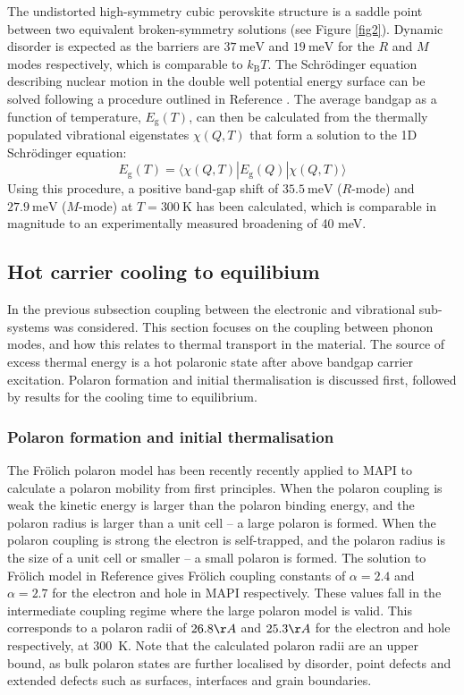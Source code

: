 \begin{table}
The undistorted high-symmetry cubic perovskite structure is a saddle point between two equivalent broken-symmetry solutions (see Figure \ref{fig2}). Dynamic disorder is expected as the barriers are $37\ \textrm{meV}$ and $19\ \textrm{meV}$ for the $R$ and $M$ modes respectively, which is comparable to $k_\mathrm{B}T$. 
The Schr\"{o}dinger equation describing nuclear motion in the double well potential energy surface can be solved following a procedure outlined in Reference \cite{Skelton2016a}. 
The average bandgap as a function of temperature, $E_\mathrm{g}(T)$, can then be calculated from the thermally populated vibrational eigenstates $\chi(Q,T)$ that form a solution to the 1D Schr\"{o}dinger equation:
\begin{equation}
E_\mathrm{g}(T) = \langle \chi(Q,T)|E_\mathrm{g}(Q)|\chi(Q,T) \rangle
\end{equation}
Using this procedure, a positive band-gap shift of $35.5\ \textrm{meV}$ ($R$-mode) and $27.9\ \textrm{meV}$ ($M$-mode) at $T=300\ \textrm{K}$ has been calculated, which is comparable in magnitude to an experimentally measured broadening of 40 meV.\autocite{Wright2016} 

\subsection{Hot carrier cooling to equilibium} \label{ch5:epcoupling}
In the previous subsection coupling between the electronic and vibrational sub-systems was considered. This section focuses on the coupling between phonon modes, and how this relates to thermal transport in the material. The source of excess thermal energy is a hot polaronic state after above bandgap carrier excitation. Polaron formation and initial thermalisation is discussed first, followed by results for the cooling time to equilibrium.

\subsubsection{Polaron formation and initial thermalisation}
The Fr\"{o}lich polaron model has been recently recently applied to MAPI to calculate a polaron mobility from first principles.\autocite{Frost2017b} %
When the polaron coupling is weak the kinetic energy is larger than the polaron binding energy, and the polaron radius is larger than a unit cell -- a large polaron is formed. When the polaron coupling is strong the electron is self-trapped, and the polaron radius is the size of a unit cell or smaller -- a small polaron is formed. The solution to Fr\"{o}lich model in Reference \cite{Frost2017b} gives Fr\"{o}lich coupling constants of $\alpha=2.4$ and $\alpha=2.7$ for the electron and hole in MAPI respectively. These values fall in the intermediate coupling regime where the large polaron model is valid. This corresponds to a polaron radii of $26.8\AA$ and $25.3\AA$ for the electron and hole respectively, at \SI{300}{\K}.
Note that the calculated polaron radii are an upper bound, as bulk polaron states are further localised by disorder, point defects and extended defects such as surfaces, interfaces and grain boundaries.


\end{table}

